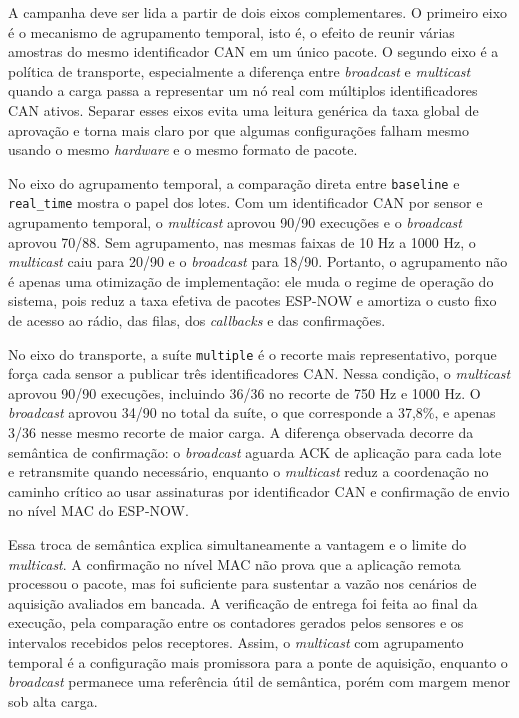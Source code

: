 A campanha deve ser lida a partir de dois eixos complementares. O primeiro eixo
é o mecanismo de agrupamento temporal, isto é, o efeito de reunir várias
amostras do mesmo identificador CAN em um único pacote. O segundo eixo é a
política de transporte, especialmente a diferença entre \emph{broadcast} e
\emph{multicast} quando a carga passa a representar um nó real com múltiplos
identificadores CAN ativos. Separar esses eixos evita uma leitura genérica da
taxa global de aprovação e torna mais claro por que algumas configurações
falham mesmo usando o mesmo \emph{hardware} e o mesmo formato de pacote.

No eixo do agrupamento temporal, a comparação direta entre \texttt{baseline} e
\texttt{real\_time} mostra o papel dos lotes. Com um identificador CAN por
sensor e agrupamento temporal, o \emph{multicast} aprovou 90/90 execuções e o
\emph{broadcast} aprovou 70/88. Sem agrupamento, nas mesmas faixas de 10 Hz a
1000 Hz, o \emph{multicast} caiu para 20/90 e o \emph{broadcast} para 18/90.
Portanto, o agrupamento não é apenas uma otimização de implementação: ele muda
o regime de operação do sistema, pois reduz a taxa efetiva de pacotes ESP-NOW e
amortiza o custo fixo de acesso ao rádio, das filas, dos \emph{callbacks} e das
confirmações.

No eixo do transporte, a suíte \texttt{multiple} é o recorte mais representativo,
porque força cada sensor a publicar três identificadores CAN. Nessa condição, o
\emph{multicast} aprovou 90/90 execuções, incluindo 36/36 no recorte de 750 Hz e
1000 Hz. O \emph{broadcast} aprovou 34/90 no total da suíte, o que corresponde a
37,8\%, e apenas 3/36 nesse mesmo recorte de maior carga. A diferença
observada decorre da semântica de confirmação: o \emph{broadcast} aguarda ACK de
aplicação para cada lote e retransmite quando necessário, enquanto o
\emph{multicast} reduz a coordenação no caminho crítico ao usar assinaturas por
identificador CAN e confirmação de envio no nível MAC do ESP-NOW.

Essa troca de semântica explica simultaneamente a vantagem e o limite do
\emph{multicast}. A confirmação no nível MAC não prova que a aplicação remota
processou o pacote, mas foi suficiente para sustentar a vazão nos cenários de
aquisição avaliados em bancada. A verificação de entrega foi feita ao final da
execução, pela comparação entre os contadores gerados pelos sensores e os
intervalos recebidos pelos receptores. Assim, o \emph{multicast} com agrupamento
temporal é a configuração mais promissora para a ponte de aquisição, enquanto o
\emph{broadcast} permanece uma referência útil de semântica, porém com margem
menor sob alta carga.

